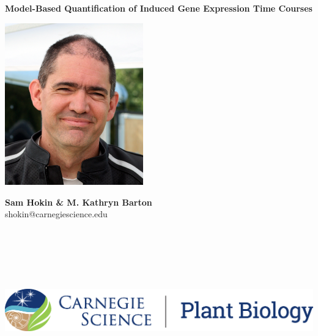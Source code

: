 \documentclass[aspb,landscape]{a0poster}
\begin{document}


{
  \color{CarnegiePriBlue} \VeryHuge
  \textbf{Model-Based Quantification of Induced Gene Expression Time Courses}    %
}
\vspace{5mm}

\begin{minipage}[m]{0.08\linewidth}
  \includegraphics[height=70mm]{sam-bfr-smiling-crop.jpg} %
\end{minipage}
\begin{minipage}[m]{0.40\linewidth}                      %
  \color{Black}
  \Huge \textbf{Sam Hokin \& M. Kathryn Barton} \\
  \Large shokin@carnegiescience.edu
\end{minipage}
\begin{minipage}[m]{0.49\linewidth}
  \includegraphics[height=70mm]{CS_plantbio_logo_horz.eps} %
\end{minipage}
\end{document}
